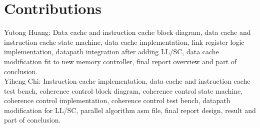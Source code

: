 \documentclass[12pt]{article}
\begin{document}
  \section{Contributions}

  Yutong Huang: Data cache and instruction cache block diagram, data cache and instruction cache state machine, data cache implementation, link register logic implementation, datapath integration after adding LL/SC, data cache modification fit to new memory controller, final report overview and part of conclusion.\\
  Yiheng Chi: Instruction cache implementation, data cache and instruction cache test bench, coherence control block diagram, coherence control state machine, coherence control implementation, coherence control test bench, datapath modification for LL/SC, parallel algorithm asm file, final report design, result and part of conclusion.
\end{document}
